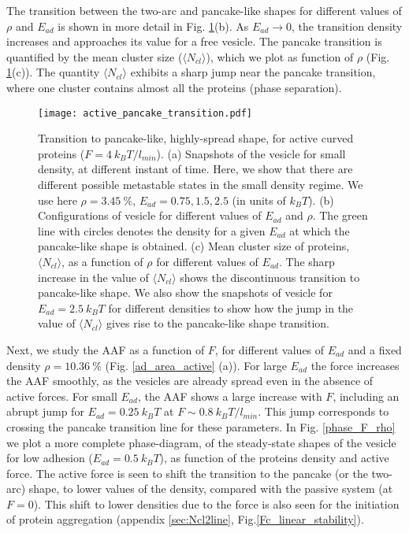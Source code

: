 \documentclass[pre,amsmath]{revtex4}
\begin{document}
The transition between the two-arc and pancake-like shapes for different values of $\rho$ and $E_{ad}$ is shown in more detail in Fig. \ref{phase_active_pancake}(b). As $E_{ad}\rightarrow0$, the transition density increases and approaches its value for a free vesicle. The pancake transition is quantified by the mean cluster size ($\langle N_{cl}\rangle$), which we plot as function of $\rho$ (Fig. \ref{phase_active_pancake}(c)). The quantity $\langle N_{cl}\rangle$ exhibits a sharp jump near the pancake transition, where one cluster contains almost all the proteins (phase separation).

\begin{figure}[ht]
\centering
\texttt{[image: active\_pancake\_transition.pdf]}
\caption{Transition to pancake-like, highly-spread shape, for active curved proteins ($F=4 ~k_B T/l_{min}$).  (a) Snapshots of the vesicle for small density, at different instant of time. Here, we show that there are different possible metastable states in the small density regime. We use here $\rho=3.45 ~\%$, $E_{ad}= 0.75, 1.5, 2.5$ (in units of $k_B T$). (b) Configurations of vesicle for different values of $E_{ad}$ and $\rho$. The green line with circles denotes the density for a given $E_{ad}$ at which the pancake-like shape is obtained. (c) Mean cluster size of proteins, $\langle N_{cl}\rangle$, as a function of $\rho$ for different values of $E_{ad}$. The sharp increase in the value of $\langle N_{cl}\rangle$ shows the discontinuous transition to pancake-like shape. We also show the snapshots of vesicle for $E_{ad}=2.5~ k_B T$ for different densities to show how the jump in the value of $\langle N_{cl}\rangle$ gives rise to the pancake-like shape transition.}
\label{phase_active_pancake} 
\end{figure}

Next, we study the AAF as a function of $F$, for different values of $E_{ad}$ and a fixed density $\rho=10.36~\%$ (Fig. \ref{ad_area_active} (a)). For large $E_{ad}$ the force increases the AAF smoothly, as the vesicles are already spread even in the absence of active forces. For small $E_{ad}$, the AAF shows a large increase with $F$, including an abrupt jump for $E_{ad}=0.25 ~k_B T$ at $F \sim 0.8 ~k_B T/l_{min}$. This jump corresponds to crossing the pancake transition line for these parameters. In Fig. \ref{phase_F_rho} we plot a more complete phase-diagram, of the steady-state shapes of the vesicle for low adhesion ($E_{ad}=0.5 ~k_B T$), as function of the proteins density and active force. The active force is seen to shift the transition to the pancake (or the two-arc) shape, to lower values of the density, compared with the passive system (at $F=0$). This shift to lower densities due to the force is also seen for the initiation of protein aggregation (appendix \ref{sec:Ncl2line}, Fig.\ref{Fc_linear_stability}).
\end{document}
